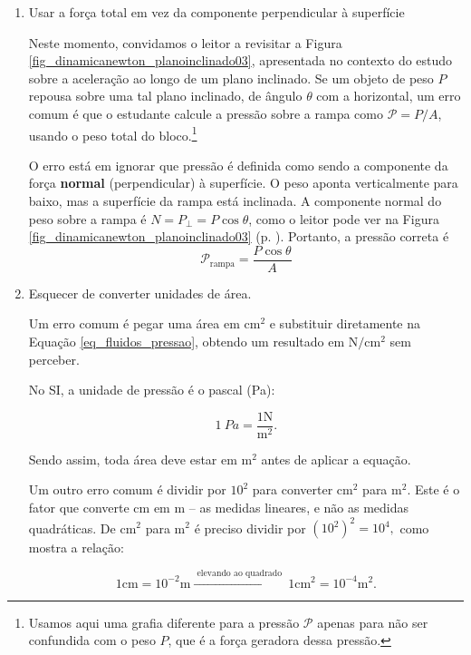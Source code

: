\begin{enumerate}
    \item [(i)] Usar a força total em vez da componente perpendicular à
superfície


Neste momento, convidamos o leitor a revisitar a Figura \ref{fig_dinamicanewton_planoinclinado03}, apresentada no contexto do estudo sobre a aceleração ao longo de um plano inclinado. Se um objeto de peso $P$ repousa sobre uma tal plano inclinado, de ângulo
$\theta$ com a horizontal, um erro comum é que o estudante calcule a pressão sobre a rampa
como $\mathcal{P} = P / A$, usando o peso total do bloco.\footnote{Usamos aqui uma grafia diferente para a pressão $\mathcal{P}$ apenas para não ser confundida com o peso $P$, que é a força geradora dessa pressão.}
 
O erro está em ignorar que pressão é definida como sendo a componente da
força \textbf{normal} (perpendicular) à superfície. O peso aponta
verticalmente para baixo, mas a superfície da rampa está inclinada.
A componente normal do peso sobre a rampa é $N=P_\perp = P\cos\theta$, como o leitor pode ver na Figura \ref{fig_dinamicanewton_planoinclinado03} (p. \pageref{fig_dinamicanewton_planoinclinado03}). Portanto, a pressão correta é
%
\begin{equation*}
    \mathcal{P}_{\text{rampa}} = \frac{P\cos\theta}{A}
\end{equation*}
%

 
 \item [(ii)] Esquecer de converter unidades de área.
 
Um erro comum é pegar uma área em cm$^2$ e substituir diretamente na Equação \eqref{eq_fluidos_pressao}, obtendo um resultado em
$\text{N}/\text{cm}^2$ sem perceber.
 
No SI, a unidade de pressão é o pascal (Pa): 

$$\SI{1}{Pa} = \dfrac{1 \text{N}}{\text{m}^2}.$$ 

Sendo assim, toda área deve estar em m$^2$ antes de aplicar a equação. 


Um outro erro comum é dividir por $10^2$ para converter cm$^2$ para m$^2.$ Este é o fator que converte cm em m -- as medidas lineares, e não as medidas quadráticas. De cm$^2$ para m$^2$ é preciso dividir por $(10^2)^2 = 10^4,$ como mostra a relação:

$$ 1 \text{cm} = 10^{-2} \text{m} \xrightarrow{\text{ elevando ao quadrado }} \boxed{1 \text{cm}^2 = 10^{-4} \text{m}^2.}$$

\end{enumerate}


